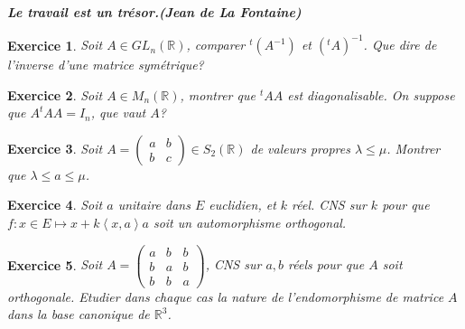 \documentclass[12pt,a4paper]{article}
\newcommand{\ps}[2]{\left\langle#1,#2\right\rangle}
\newcommand{\R}{\mathbb{R}}
\theoremstyle{break}
\newtheorem{Exo}{Exercice}
\begin{document}
\emph{\textbf{
\og Le travail est un trésor.\fg (Jean de La Fontaine)
}}


\begin{Exo}
	Soit $A\in GL_n(\R)$, comparer $^t(A^{-1})$ et $(^tA)^{-1}$. Que dire de l'inverse d'une matrice symétrique?
\end{Exo}

\begin{Exo}
	Soit $A\in M_n(\R)$, montrer que $^tAA$ est diagonalisable. On suppose que $A^tAA=I_n$, que vaut $A$?
\end{Exo}

\begin{Exo}
	Soit $A=\begin{pmatrix}
		a & b \\
		b & c
	\end{pmatrix}
	\in S_2(\R)$ de valeurs propres $\lambda \leqslant \mu$. Montrer que $\lambda\leqslant a\leqslant \mu$.
\end{Exo}

\begin{Exo}
	Soit $a$ unitaire dans $E$ euclidien, et $k$ réel. CNS sur $k$ pour que $f:x\in E\mapsto x+k\ps{x}{a}a$ soit un automorphisme orthogonal.
\end{Exo}

\begin{Exo}
	Soit $A=\begin{pmatrix}
		a & b & b \\
		b & a & b \\
		b & b & a
	\end{pmatrix}$, CNS sur $a,b$ réels pour que $A$ soit orthogonale. Etudier dans chaque cas la nature de l'endomorphisme de matrice $A$ dans la base canonique de $\R^3$.
	
\end{Exo}
\end{document}

